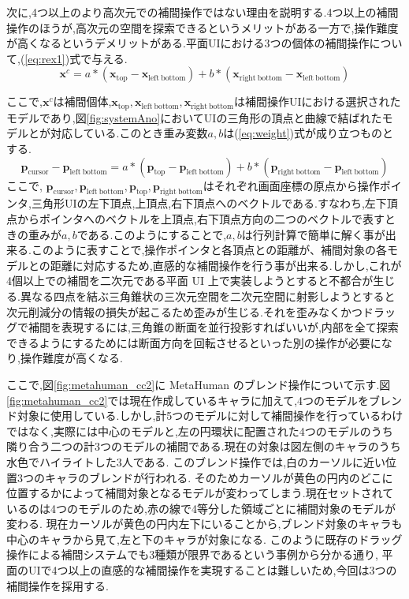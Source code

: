 \newpage


次に,4つ以上のより高次元での補間操作ではない理由を説明する.4つ以上の補間操作のほうが,高次元の空間を探索できるというメリットがある一方で,操作難度が高くなるというデメリットがある.平面UIにおける3つの個体の補間操作について,(\ref{eq:rex1})式で与える.
\begin{equation}\label{eq:rex1}
    \bm{x}^c = a*(\bm{x}_\mathrm{top} - \bm{x}_\mathrm{left\ bottom}) + b*(\bm{x}_\mathrm{right\ bottom} - \bm{x}_\mathrm{left\ bottom})
\end{equation}


ここで,$\mathbf{x}^c$は補間個体,$\mathbf{x}_\mathrm{top},\mathbf{x}_\mathrm{left\ bottom},\mathbf{x}_\mathrm{right\ bottom}$は補間操作UIにおける選択されたモデルであり,図\ref{fig:systemAno}においてUIの三角形の頂点と曲線で結ばれたモデルとが対応している.このとき重み変数$a,b$は(\ref{eq:weight})式が成り立つものとする.
\begin{equation}\label{eq:weight}
    \bm{p}_\mathrm{cursor} - \bm{p}_\mathrm{left\ bottom}  = a*(\bm{p}_\mathrm{top} - \bm{p}_\mathrm{left\ bottom}) + b*(\bm{p}_\mathrm{right\ bottom} - \bm{p}_\mathrm{left\ bottom})
\end{equation}
ここで, $\bm{p}_\mathrm{cursor}, \bm{p}_\mathrm{left\ bottom}, \bm{p}_\mathrm{top}, \bm{p}_\mathrm{right\ bottom}$はそれぞれ画面座標の原点から操作ポインタ,三角形UIの左下頂点,上頂点,右下頂点へのベクトルである.すなわち,左下頂点からポインタへのベクトルを上頂点,右下頂点方向の二つのベクトルで表すときの重みが$a,b$である.このようにすることで,$a,b$は行列計算で簡単に解く事が出来る.このように表すことで,操作ポインタと各頂点との距離が、補間対象の各モデルとの距離に対応するため,直感的な補間操作を行う事が出来る.しかし,これが4個以上での補間を二次元である平面 UI 上で実装しようとすると不都合が生じる.異なる四点を結ぶ三角錐状の三次元空間を二次元空間に射影しようとすると次元削減分の情報の損失が起こるため歪みが生じる.それを歪みなくかつドラッグで補間を表現するには,三角錐の断面を並行投影すればいいが,内部を全て探索できるようにするためには断面方向を回転させるといった別の操作が必要になり,操作難度が高くなる.



ここで,図\ref{fig:metahuman_cc2}に MetaHuman のブレンド操作について示す.図\ref{fig:metahuman_cc2}では現在作成しているキャラに加えて,4つのモデルをブレンド対象に使用している.しかし,計5つのモデルに対して補間操作を行っているわけではなく,実際には中心のモデルと,左の円環状に配置された4つのモデルのうち隣り合う二つの計3つのモデルの補間である.現在の対象は図左側のキャラのうち水色でハイライトした3人である.
このブレンド操作では,白のカーソルに近い位置3つのキャラのブレンドが行われる.
そのためカーソルが黄色の円内のどこに位置するかによって補間対象となるモデルが変わってしまう.現在セットされているのは4つのモデルのため,赤の線で4等分した領域ごとに補間対象のモデルが変わる.
現在カーソルが黄色の円内左下にいることから,ブレンド対象のキャラも中心のキャラから見て,左と下のキャラが対象になる.
このように既存のドラッグ操作による補間システムでも3種類が限界であるという事例から分かる通り,
平面のUIで4つ以上の直感的な補間操作を実現することは難しいため,今回は3つの補間操作を採用する.

